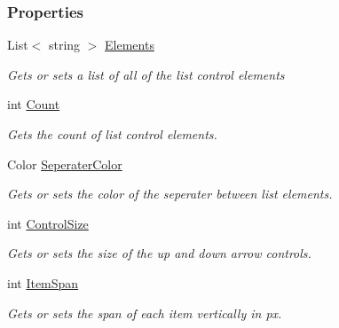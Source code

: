 \subsubsection*{Properties}
\begin{DoxyCompactItemize}
\item 
List$<$ string $>$ \hyperlink{class_m_b2_d_1_1_u_i_1_1_list_control_a868436cd81ebe891d8748da7b48a7c30}{Elements}
\begin{DoxyCompactList}\small\item\em Gets or sets a list of all of the list control elements \end{DoxyCompactList}\item 
int \hyperlink{class_m_b2_d_1_1_u_i_1_1_list_control_a231b53abfe2a6040567bb6bc3bf1cee4}{Count}
\begin{DoxyCompactList}\small\item\em Gets the count of list control elements. \end{DoxyCompactList}\item 
Color \hyperlink{class_m_b2_d_1_1_u_i_1_1_list_control_ac5c3ad4a524d48a490f7e4bfa088c0e1}{Seperater\+Color}
\begin{DoxyCompactList}\small\item\em Gets or sets the color of the seperater between list elements. \end{DoxyCompactList}\item 
int \hyperlink{class_m_b2_d_1_1_u_i_1_1_list_control_aafbb7c455f4ba9832be33a603287ed08}{Control\+Size}
\begin{DoxyCompactList}\small\item\em Gets or sets the size of the up and down arrow controls. \end{DoxyCompactList}\item 
int \hyperlink{class_m_b2_d_1_1_u_i_1_1_list_control_a67c7e5b6c19678f4c9d1fd111d87f056}{Item\+Span}
\begin{DoxyCompactList}\small\item\em Gets or sets the span of each item vertically in px. \end{DoxyCompactList}\end{DoxyCompactItemize}
